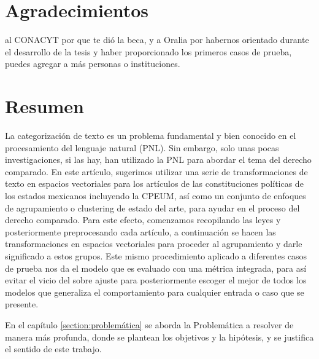\documentclass[12pt]{article}
\begin{document}
	
	
	
	
	\tableofcontents
	\newpage
	
	\section*{Agradecimientos}
	 al CONACYT por que te dió la beca, y a Oralia por habernos orientado durante el desarrollo de la tesis y haber proporcionado los primeros casos de prueba, puedes agregar a más personas o instituciones.
	
	
	\section*{Resumen}
	La categorización de texto es un problema fundamental y bien conocido en el procesamiento del lenguaje natural (PNL). Sin embargo, solo unas pocas investigaciones, si las hay, han utilizado la PNL para abordar el tema del derecho comparado. En este artículo, sugerimos utilizar una serie de transformaciones de texto en espacios vectoriales para los artículos de las constituciones políticas de los estados mexicanos incluyendo la CPEUM, así como un conjunto de enfoques de agrupamiento o clustering de estado del arte, para ayudar en el proceso del derecho comparado. Para este efecto, comenzamos recopilando las leyes y posteriormente preprocesando cada artículo, a continuación se hacen las transformaciones en espacios vectoriales para proceder al agrupamiento y darle significado a estos grupos. Este mismo procedimiento aplicado a diferentes casos de prueba nos da el modelo que es evaluado con una métrica integrada, para así evitar el vicio del sobre ajuste para posteriormente escoger el mejor de todos los modelos que generaliza el comportamiento para cualquier entrada o caso que se presente. 
	
	En el capítulo \ref{section:problemática} se aborda la Problemática a resolver de manera más profunda, donde se plantean los objetivos y la hipótesis, y se justifica el sentido de este trabajo.
	\newpage
	
\end{document}
